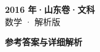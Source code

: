 \documentclass[zihao=-4, a4paper]{ctexart}
\begin{document}
\begin{center}
  {\Large\bfseries 2016 年·山东卷·文科}\\[4pt]
  {\large 数学 · 解析版}
\end{center}
\medskip
{}

\clearpage
{}
\begin{center}{\Large\bfseries 参考答案与详细解析}\end{center}
\medskip

\end{document}
